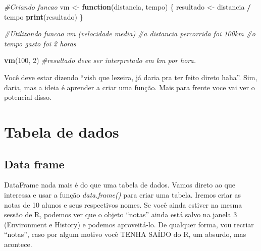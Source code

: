 \documentclass[
]{book}
\newenvironment{Shaded}{\begin{snugshade}}{\end{snugshade}}
\newcommand{\CommentTok}[1]{\textcolor[rgb]{0.56,0.35,0.01}{\textit{#1}}}
\newcommand{\ControlFlowTok}[1]{\textcolor[rgb]{0.13,0.29,0.53}{\textbf{#1}}}
\newcommand{\DecValTok}[1]{\textcolor[rgb]{0.00,0.00,0.81}{#1}}
\newcommand{\FunctionTok}[1]{\textcolor[rgb]{0.13,0.29,0.53}{\textbf{#1}}}
\newcommand{\NormalTok}[1]{#1}
\newcommand{\OtherTok}[1]{\textcolor[rgb]{0.56,0.35,0.01}{#1}}
\newcommand{\SpecialCharTok}[1]{\textcolor[rgb]{0.81,0.36,0.00}{\textbf{#1}}}
\begin{document}
\begin{Shaded}
\begin{Highlighting}[]
\CommentTok{\#Criando funcao}
\NormalTok{vm }\OtherTok{\textless{}{-}} \ControlFlowTok{function}\NormalTok{(distancia, tempo) \{}
\NormalTok{  resultado }\OtherTok{\textless{}{-}}\NormalTok{ distancia }\SpecialCharTok{/}\NormalTok{ tempo}
  \FunctionTok{print}\NormalTok{(resultado)}
\NormalTok{\}}

\CommentTok{\#Utilizando funcao vm (velocidade media)}
\CommentTok{\#a distancia percorrida foi 100km}
\CommentTok{\#o tempo gasto foi 2 horas}

\FunctionTok{vm}\NormalTok{(}\DecValTok{100}\NormalTok{, }\DecValTok{2}\NormalTok{) }\CommentTok{\#resultado deve ser interpretado em km por hora.}
\end{Highlighting}
\end{Shaded}

Você deve estar dizendo ``vish que lezeira, já daria pra ter feito direto haha''. Sim, daria, mas a ideia é aprender a criar uma função. Mais para frente voce vai ver o potencial disso.

\hypertarget{tabela-de-dados}{%
\section{Tabela de dados}\label{tabela-de-dados}}

\hypertarget{data-frame}{%
\subsection{Data frame}\label{data-frame}}

DataFrame nada mais é do que uma tabela de dados. Vamos direto ao que interessa e usar a função \emph{data.frame()} para criar uma tabela. Iremos criar as notas de 10 alunos e seus respectivos nomes. Se você ainda estiver na mesma sessão de R, podemos ver que o objeto ``notas'' ainda está salvo na janela 3 (Environment e History) e podemos aproveitá-lo. De qualquer forma, vou recriar ``notas'', caso por algum motivo você TENHA SAÍDO do R, um absurdo, mas acontece.
\end{document}
